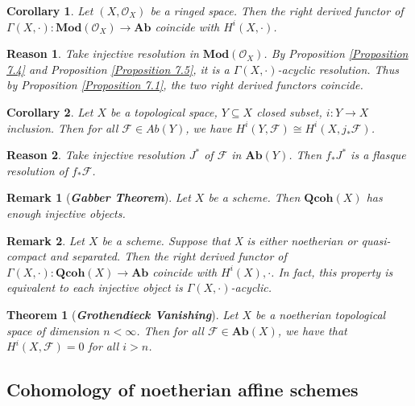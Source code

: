\documentclass{ctexart}
\newtheorem{remark}{Remark}[section]
\newtheorem{theorem}{Theorem}[section]
\newtheorem{reason}{Reason}[section]
\newtheorem{corollary}{Corollary}[section]
\newcommand{\abeliangroups}{\mathbf{Ab}}
\newcommand{\module}{\mathbf{Mod}}
\newcommand{\quasicoherent}{\mathbf{Qcoh}}
\begin{document}
\begin{corollary}
    Let $(X, \mathcal{O}_{X})$ be a ringed space.
    Then the right derived functor of $\Gamma(X, \cdot): \module (\mathcal{O}_{X}) \longrightarrow \abeliangroups$ coincide with $H^{i}(X, \cdot)$.
    \label{Corollary 7.2}
\end{corollary}
\begin{reason}
    Take injective resolution in $\module (\mathcal{O}_{X})$.
    By Proposition \ref{Proposition 7.4} and Proposition \ref{Proposition 7.5}, it is a $\Gamma(X, \cdot)$-acyclic resolution.
    Thus by Proposition \ref{Proposition 7.1}, the two right derived functors coincide.
\end{reason}
\begin{corollary}
    Let $X$ be a topological space, $Y \subseteq X$ closed subset, $i: Y \longrightarrow X$ inclusion.
    Then for all $\mathcal{F}\in Ab(Y)$, we have $H^{i}(Y, \mathcal{F}) \cong H^{i}(X, j_{\ast}\mathcal{F})$.
    \label{Corollary 7.3}
\end{corollary}
\begin{reason}
    Take injective resolution $J^{\ast}$ of $\mathcal{F}$ in $\abeliangroups (Y)$.
    Then $f_{\ast}J^{\ast}$ is a flasque resolution of $f_{\ast}\mathcal{F}$.
\end{reason}
\begin{remark}[\textbf{\emph{Gabber Theorem}}]
    Let $X$ be a scheme.
    Then $\quasicoherent (X)$ has enough injective objects.
\end{remark}
\begin{remark}
    Let $X$ be a scheme.
    Suppose that X is either noetherian or quasi-compact and separated.
    Then the right derived functor of $\Gamma(X, \cdot): \quasicoherent (X) \longrightarrow \abeliangroups$ coincide with $H^{i}(X), \cdot$.
    In fact, this property is equivalent to each injective object is $\Gamma(X, \cdot)$-acyclic.
\end{remark}
\begin{theorem}[\textbf{\emph{Grothendieck Vanishing}}]
    Let $X$ be a noetherian topological space of dimension $n < \infty$.
    Then for all $\mathcal{F}\in \abeliangroups (X)$, we have that $H^{i}(X, \mathcal{F}) = 0$ for all $i > n$.
    \label{Theorem 7.1}
\end{theorem}

\subsection{Cohomology of noetherian affine schemes}
\label{subsection:Sheaf_Cohomology_Cohomology_of_noetherian_affine_schemes}
\end{document}
